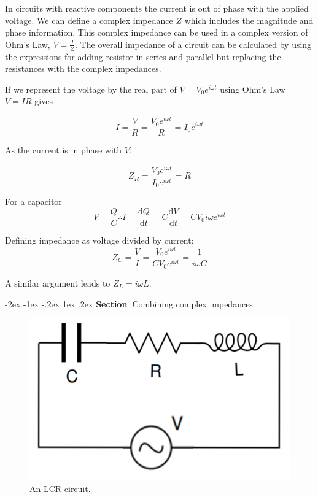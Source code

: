 \documentclass[
]{book}
\makeatletter
\renewcommand\section{%
\@startsection{section}{1}{\z@}%
              {-2ex \@plus -1ex \@minus -.2ex}%
              {1ex \@plus .2ex}%
              {\sffamily\bfseries\large\noindent Section~}}
\numberwithin{equation}{section}
\makeatother
\begin{document}
In circuits with reactive components the current is out of phase with
the applied voltage. We can define a complex impedance \(Z\) which
includes the magnitude and phase information. This complex impedance can
be used in a complex version of Ohm's Law, \(V = \frac{I}{Z}\). The
overall impedance of a circuit can be calculated by using the
expressions for adding resistor in series and parallel but replacing the
resistances with the complex impedances.

If we represent the voltage by the real part of \(V = V_0 e^{i\omega t}\)
using Ohm's Law \(V = IR\) gives

\begin{equation}
\label{eq:IvsT}
I = \frac{V}{R} = \frac{ V_0 e^{i\omega t} }{R} = I_0 e^{i\omega t}
\end{equation}

As the current is in phase with \(V\),

\begin{equation}
\label{eq:impedanceVI}
Z_R = \frac{V_0 e^{i\omega t} }{ I_0 e^{i\omega t}} = R
\end{equation}

For a capacitor
\begin{equation}
\label{eq:foraCapacitor}
V = \frac{Q}{C} \therefore I = \frac{\mathrm{d} Q}{\mathrm{d} t} = C \frac{\mathrm{d} V}{\mathrm{d} t} = C V_0 i \omega e^{i\omega t}
\end{equation}

Defining impedance as voltage divided by current:
\begin{equation}
\label{eq:ZVI}
Z_C = \frac{V}{I} = \frac{V_0 e^{i\omega t} }{C V_0 e^{i\omega t}} = \frac{1}{i\omega C}
\end{equation}

A similar argument leads to \(Z_L = i\omega L\).

\hypertarget{combining-complex-impedances}{%
\section{Combining complex impedances}\label{combining-complex-impedances}}

\begin{figure}

{\centering \includegraphics[width=0.7\linewidth]{Figures/LCR_circuit} 

}

\caption{An LCR circuit.}\label{fig:LCRcircuit}
\end{figure}
\end{document}
